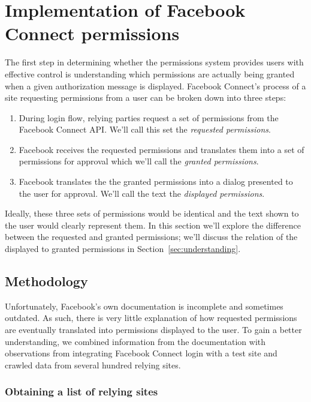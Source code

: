 \documentclass[10pt]{sig-alternate-10pt}
\begin{document}
\section{Implementation of Facebook Connect permissions}

The first step in determining whether the permissions system provides users with effective control is understanding which permissions are actually being granted when a given authorization message is displayed.
Facebook Connect's process of a site requesting permissions from a user can be broken down into three steps:

\begin{enumerate}
  \item During login flow, relying parties request a set of permissions from the Facebook Connect API. We'll call this set the \textit{requested permissions}.
  \item Facebook receives the requested permissions and translates them into a set of permissions for approval which we'll call the \textit{granted permissions}.
  \item Facebook translates the the granted permissions into a dialog presented to the user for approval. We'll call the text the \textit{displayed permissions}.
\end{enumerate}

Ideally, these three sets of permissions would be identical and the text shown to the user would clearly represent them. In this section we'll explore the difference between the requested and granted permissions; we'll discuss the relation of the displayed to granted permissions in Section~\ref{sec:understanding}.

\subsection{Methodology}

Unfortunately, Facebook's own documentation \cite{fbdocs} is incomplete and sometimes outdated. 
As such, there is very little explanation of how requested permissions are eventually translated into permissions displayed to the user.
To gain a better understanding, we combined information from the documentation with observations from integrating Facebook Connect login with a test site and crawled data from several hundred relying sites.

\subsubsection{Obtaining a list of relying sites}
\end{document}
